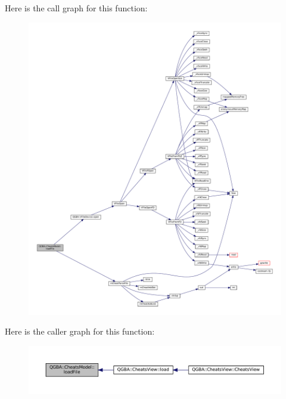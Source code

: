 Here is the call graph for this function\+:
\nopagebreak
\begin{figure}[H]
\begin{center}
\leavevmode
\includegraphics[width=350pt]{class_q_g_b_a_1_1_cheats_model_a0177e1111cf3f303ce64dbb216a5eed3_cgraph}
\end{center}
\end{figure}
Here is the caller graph for this function\+:
\nopagebreak
\begin{figure}[H]
\begin{center}
\leavevmode
\includegraphics[width=350pt]{class_q_g_b_a_1_1_cheats_model_a0177e1111cf3f303ce64dbb216a5eed3_icgraph}
\end{center}
\end{figure}
\mbox{\label{class_q_g_b_a_1_1_cheats_model_a4afdb0b4cf8e3ee616a79ad63bb2e98b}} 
